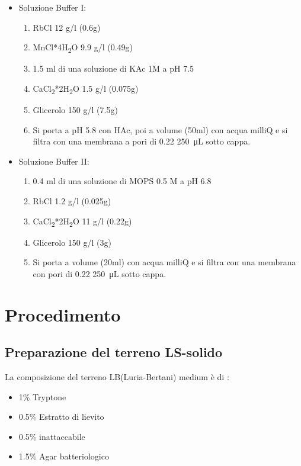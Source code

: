 \begin{itemize}

  \item Soluzione Buffer I:
  \begin{enumerate}
    \item RbCl 12 g/l (0.6g)
    \item MnCl*4H\textsubscript{2}O 9.9 g/l (0.49g)
    \item 1.5 ml di una soluzione di KAc 1M a pH 7.5
    \item CaCl\textsubscript{2}*2H\textsubscript{2}O 1.5 g/l (0.075g)
    \item Glicerolo 150 g/l (7.5g)
    \item Si porta a pH 5.8 con HAc, poi a volume (50ml) con acqua milliQ e si filtra con una membrana a pori di 0.22 \SI{250}{\micro\liter} sotto cappa.
  \end{enumerate}
  \item Soluzione Buffer II:
  \begin{enumerate}
    \item 0.4 ml di una soluzione di MOPS 0.5 M a pH 6.8
    \item RbCl 1.2 g/l (0.025g)
    \item CaCl\textsubscript{2}*2H\textsubscript{2}O 11 g/l (0.22g)
    \item Glicerolo 150 g/l (3g)
    \item Si porta a volume (20ml) con acqua milliQ e si filtra con una membrana con pori di 0.22 \SI{250}{\micro\liter} sotto cappa.
  \end{enumerate}

\end{itemize}

\section{Procedimento}

\subsection{Preparazione del terreno LS-solido}

La composizione del terreno LB(Luria-Bertani) medium è di :

\begin{itemize}
  \item 1\% Tryptone
  \item 0.5\% Estratto di lievito
  \item 0.5\% inattaccabile
  \item 1.5\% Agar batteriologico
\end{itemize}

